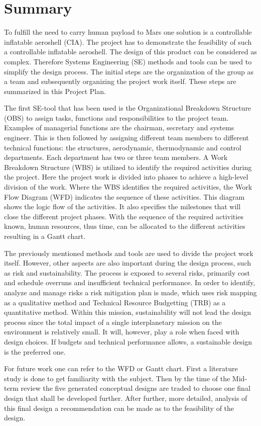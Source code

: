 \section*{Summary}\label{cha:summary}
To fulfill the need to carry human payload to Mars one solution is a controllable inflatable aeroshell (CIA). The project has to demonstrate the feasibility of such a controllable inflatable aeroshell. The design of this product can be considered as complex. Therefore Systems Engineering (SE) methods and tools can be used to simplify the design process. The initial steps are the organization of the group as a team and subsequently organizing the project work itself. These steps are summarized in this Project Plan.

The first SE-tool that has been used is the Organizational Breakdown Structure (OBS) to assign tasks, functions and responsibilities to the project team. Examples of managerial functions are the chairman, secretary and systems engineer. This is then followed by assigning different team members to different technical functions: the structures, aerodynamic, thermodynamic and control departments. Each department has two or three team members. A Work Breakdown Structure (WBS) is utilized to identify the required activities during the project. Here the project work is divided into phases to achieve a high-level division of the work. Where the WBS identifies the required activities, the Work Flow Diagram (WFD) indicates the sequence of these activities. This diagram shows the logic flow of the activities. It also specifies the milestones that will close the different project phases. With the sequence of the required activities known, human resources, thus time, can be allocated to the different activities resulting in a Gantt chart. 

The previously mentioned methods and tools are used to divide the project work itself. However, other aspects are also important during the design process, such as risk and sustainability. The process is exposed to several risks, primarily cost and schedule overruns and insufficient technical performance. In order to identify, analyze and manage risks a risk mitigation plan is made, which uses risk mapping as a qualitative method and Technical Resource Budgetting (TRB) as a quantitative method. Within this mission, sustainability will not lead the design process since the total impact of a single interplanetary mission on the environment is relatively small. It will, however, play a role when faced with design choices. If budgets and technical performance allows, a sustainable design is the preferred one.

For future work one can refer to the WFD or Gantt chart. First a literature study is done to get familiarity with the subject. Then by the time of the Mid-term review the five generated conceptual designs are traded to choose one final design that shall be developed further. After further, more detailed, analysis of this final design a recommendation can be made as to the feasibility of the design.